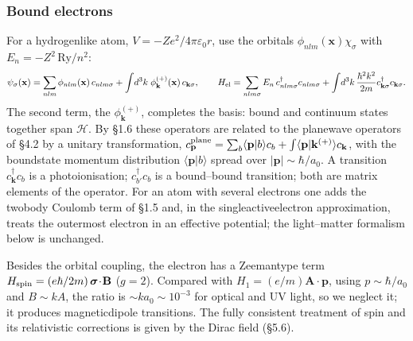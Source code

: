\documentclass[letterpaper,10pt,english]{jupyterBook}
\begin{document}
\subsubsection*{Bound electrons}

\sphinxAtStartPar
For a hydrogen\sphinxhyphen{}like atom, \(V=-Ze^2/4\pi\varepsilon_0r\), use the orbitals \(\phi_{nlm}(\mathbf x)\chi_\sigma\) with \(E_n=-Z^2\,\text{Ry}/n^2\):
\begin{equation*}
\begin{split}
\psi_\sigma(\mathbf x)=\sum_{nlm}\phi_{nlm}(\mathbf x)\,c_{nlm\sigma}+\int\!d^3k\;\phi^{(+)}_{\mathbf k}(\mathbf x)\,c_{\mathbf k\sigma},\qquad
H_{\rm el}=\sum_{nlm\sigma}E_n\,c^\dagger_{nlm\sigma}c_{nlm\sigma}+\int\!d^3k\,\frac{\hbar^2k^2}{2m}c^\dagger_{\mathbf k\sigma}c_{\mathbf k\sigma}.
\end{split}
\end{equation*}
\sphinxAtStartPar
The second term, the  \(\phi^{(+)}_{\mathbf k}\), completes the basis: bound and continuum states together span \(\mathcal H\). By §1.6 these operators are related to the plane\sphinxhyphen{}wave operators of §4.2 by a unitary transformation, \(c^{\rm plane}_{\mathbf p}=\sum_b\langle\mathbf p|b\rangle c_b+\int\langle\mathbf p|\mathbf k^{(+)}\rangle c_{\mathbf k}\), with the bound\sphinxhyphen{}state momentum distribution \(\langle\mathbf p|b\rangle\) spread over \(|\mathbf p|\sim\hbar/a_0\).  A transition \(c^\dagger_{\mathbf k}c_{b}\) is a photoionisation; \(c^\dagger_{b'}c_{b}\) is a bound–bound transition; both are matrix elements of the  operator. For an atom with several electrons one adds the two\sphinxhyphen{}body Coulomb term of §1.5 and, in the single\sphinxhyphen{}active\sphinxhyphen{}electron approximation, treats the outermost electron in an effective potential; the light–matter formalism below is unchanged.

\sphinxAtStartPar
{} Besides the orbital coupling, the electron has a Zeeman\sphinxhyphen{}type term \(H_{\rm spin}=(e\hbar/2m)\,\boldsymbol\sigma\!\cdot\!\mathbf B\) (\(g=2\)). Compared with \(H_1=(e/m)\mathbf A\!\cdot\!\mathbf p\), using \(p\sim\hbar/a_0\) and \(B\sim kA\), the ratio is \(\sim ka_0\sim10^{-3}\) for optical and UV light, so we neglect it; it produces magnetic\sphinxhyphen{}dipole transitions. The fully consistent treatment of spin and its relativistic corrections is given by the Dirac field (§5.6).
\end{document}
